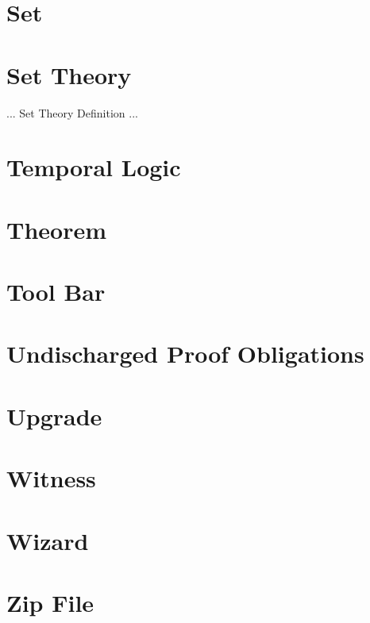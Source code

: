 \section{Set}
\label{set}

\section{Set Theory}
\label{set_theory}

... Set Theory Definition ...

\section{Temporal Logic}
\label{temporal_logic}

\section{Theorem}
\label{theorem}

\section{Tool Bar}
\label{tool_bar}

\section{Undischarged Proof Obligations}
\label{undischarged_proof_obligations}

\section{Upgrade}
\label{Upgrade}


\section{Witness}
\label{witness}

\section{Wizard}
\label{wizard}

\section{Zip File}
\label{zip_file}


